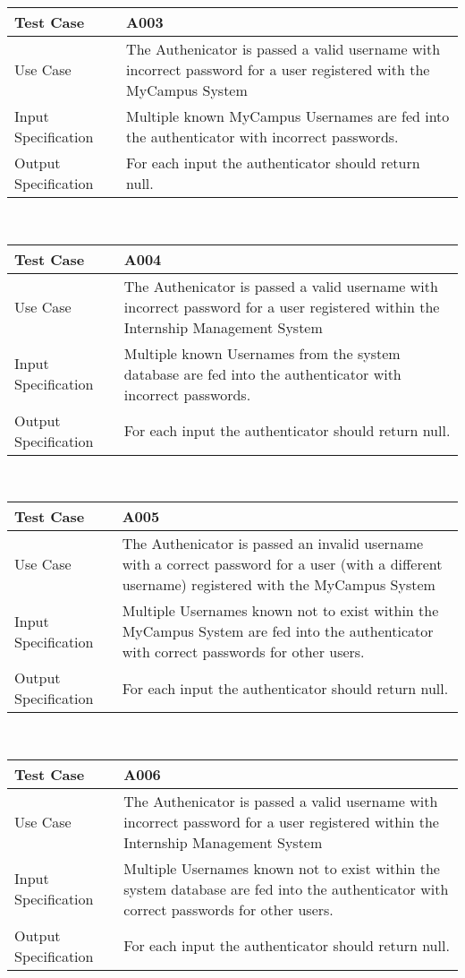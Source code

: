 \documentclass[12pt,a4paper,english,intoc,bibliography=totoc,index=totoc,BCOR10mm,captions=tableheading,titlepage,fleqn]{scrbook}
\providecommand{\tabularnewline}{\\}
\begin{document}
\begin{tabular}{lp{10cm}}
\hline 
\textbf{Test Case} & A003\tabularnewline
\hline 
\hline 
Use Case & The Authenicator is passed a valid username with incorrect password for a user
registered with the MyCampus System\tabularnewline
\hline 
Input Specification & Multiple known MyCampus Usernames are fed into the authenticator with incorrect passwords.\tabularnewline
\hline 
Output Specification & For each input the authenticator should return null.\tabularnewline
\hline 
\end{tabular}\\

\begin{tabular}{lp{10cm}}
\hline 
\textbf{Test Case} & A004\tabularnewline
\hline 
\hline 
Use Case & The Authenicator is passed a valid username with incorrect password for a user
registered within the Internship Management System\tabularnewline
\hline 
Input Specification & Multiple known Usernames from the system database are fed into the authenticator with incorrect passwords.\tabularnewline
\hline 
Output Specification & For each input the authenticator should return null.\tabularnewline
\hline 
\end{tabular}\\

\begin{tabular}{lp{10cm}}
\hline 
\textbf{Test Case} & A005\tabularnewline
\hline 
\hline 
Use Case & The Authenicator is passed an invalid username with a correct password for a user (with a different username)
registered with the MyCampus System\tabularnewline
\hline 
Input Specification & Multiple Usernames known not to exist within the MyCampus System are fed into the authenticator with correct passwords for other users.\tabularnewline
\hline 
Output Specification & For each input the authenticator should return null.\tabularnewline
\hline 
\end{tabular}\\

\begin{tabular}{lp{10cm}}
\hline 
\textbf{Test Case} & A006\tabularnewline
\hline 
\hline 
Use Case & The Authenicator is passed a valid username with incorrect password for a user
registered within the Internship Management System\tabularnewline
\hline 
Input Specification & Multiple Usernames known not to exist within the system database are fed into the authenticator with correct passwords for other users.\tabularnewline
\hline 
Output Specification & For each input the authenticator should return null.\tabularnewline
\hline 
\end{tabular}\\
\end{document}

